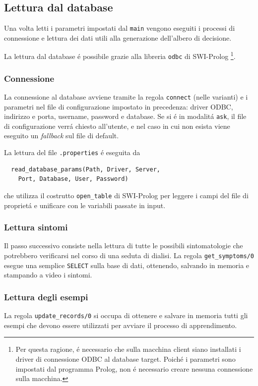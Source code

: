 \documentclass[preprint]{acm_proc_article-sp}
\begin{document}
\subsection{Lettura dal database}
\label{prolog-database}
Una volta letti i parametri impostati dal \verb|main| vengono eseguiti i processi di connessione e lettura dei dati utili alla generazione dell'albero di decisione.

La lettura dal database \'e possibile grazie alla libreria \verb|odbc| di SWI-Prolog \footnote{Per questa ragione, \'e necessario che sulla macchina client siano installati i driver di connessione ODBC al database target. Poich\'e i parametri sono impostati dal programma Prolog, non \'e necessario creare nessuna connessione sulla macchina.}.

\subsubsection{Connessione}
La connessione al database avviene tramite la regola \verb|connect| (nelle varianti) e i parametri nel file di configurazione impostato in precedenza: driver ODBC, indirizzo e porta, username, password e database. Se si \'e in modalit\'a \verb|ask|, il file di configurazione verr\'a chiesto all'utente, e nel caso in cui non esista viene eseguito un \textit{fallback} sul file di default.

La lettura del file \verb|.properties| \'e eseguita da
\begin{verbatim}
  read_database_params(Path, Driver, Server, 
  	Port, Database, User, Password)
\end{verbatim}
che utilizza il costrutto \verb|open_table| di SWI-Prolog per leggere i campi del file di propriet\'a e unificare con le variabili passate in input.

\subsubsection{Lettura sintomi}
Il passo successivo consiste nella lettura di tutte le possibili sintomatologie che potrebbero verificarsi nel corso di una seduta di dialisi. La regola \verb|get_symptoms/0| esegue una semplice \texttt{SELECT} sulla base di dati, ottenendo, salvando in memoria e stampando a video i sintomi.

\subsubsection{Lettura degli esempi}
La regola \verb|update_records/0| si occupa di ottenere e salvare in memoria tutti gli esempi che devono essere utilizzati per avviare il processo di apprendimento.
\end{document}
